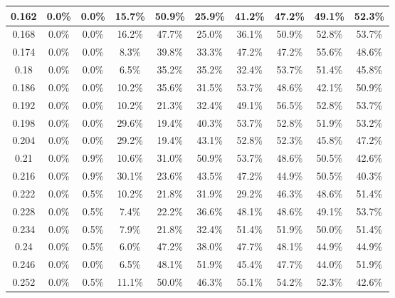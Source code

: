 \begin{table}[H]
\begin{tabular}{|c|c|c|c|c|c|c|c|c|c|}
\hline
0.162 & \cellcolor{green!25}0.0\% & \cellcolor{green!25}0.0\% & 15.7\% & 50.9\% & 25.9\% & 41.2\% & 47.2\% & 49.1\% & 52.3\% \\
\hline
0.168 & \cellcolor{green!25}0.0\% & \cellcolor{green!25}0.0\% & 16.2\% & 47.7\% & 25.0\% & 36.1\% & 50.9\% & 52.8\% & 53.7\% \\
\hline
0.174 & \cellcolor{green!25}0.0\% & \cellcolor{green!25}0.0\% & 8.3\% & 39.8\% & 33.3\% & 47.2\% & 47.2\% & 55.6\% & 48.6\% \\
\hline
0.18 & \cellcolor{green!25}0.0\% & \cellcolor{green!25}0.0\% & 6.5\% & 35.2\% & 35.2\% & 32.4\% & 53.7\% & 51.4\% & 45.8\% \\
\hline
0.186 & \cellcolor{green!25}0.0\% & \cellcolor{green!25}0.0\% & 10.2\% & 35.6\% & 31.5\% & 53.7\% & 48.6\% & 42.1\% & 50.9\% \\
\hline
0.192 & \cellcolor{green!25}0.0\% & \cellcolor{green!25}0.0\% & 10.2\% & 21.3\% & 32.4\% & 49.1\% & 56.5\% & 52.8\% & 53.7\% \\
\hline
0.198 & \cellcolor{green!25}0.0\% & \cellcolor{green!25}0.0\% & 29.6\% & 19.4\% & 40.3\% & 53.7\% & 52.8\% & 51.9\% & 53.2\% \\
\hline
0.204 & \cellcolor{green!25}0.0\% & \cellcolor{green!25}0.0\% & 29.2\% & 19.4\% & 43.1\% & 52.8\% & 52.3\% & 45.8\% & 47.2\% \\
\hline
0.21 & \cellcolor{green!25}0.0\% & 0.9\% & 10.6\% & 31.0\% & 50.9\% & 53.7\% & 48.6\% & 50.5\% & 42.6\% \\
\hline
0.216 & \cellcolor{green!25}0.0\% & 0.9\% & 30.1\% & 23.6\% & 43.5\% & 47.2\% & 44.9\% & 50.5\% & 40.3\% \\
\hline
0.222 & \cellcolor{green!25}0.0\% & 0.5\% & 10.2\% & 21.8\% & 31.9\% & 29.2\% & 46.3\% & 48.6\% & 51.4\% \\
\hline
0.228 & \cellcolor{green!25}0.0\% & 0.5\% & 7.4\% & 22.2\% & 36.6\% & 48.1\% & 48.6\% & 49.1\% & 53.7\% \\
\hline
0.234 & \cellcolor{green!25}0.0\% & 0.5\% & 7.9\% & 21.8\% & 32.4\% & 51.4\% & 51.9\% & 50.0\% & 51.4\% \\
\hline
0.24 & \cellcolor{green!25}0.0\% & 0.5\% & 6.0\% & 47.2\% & 38.0\% & 47.7\% & 48.1\% & 44.9\% & 44.9\% \\
\hline
0.246 & \cellcolor{green!25}0.0\% & \cellcolor{green!25}0.0\% & 6.5\% & 48.1\% & 51.9\% & 45.4\% & 47.7\% & 44.0\% & 51.9\% \\
\hline
0.252 & \cellcolor{green!25}0.0\% & 0.5\% & 11.1\% & 50.0\% & 46.3\% & 55.1\% & 54.2\% & 52.3\% & 42.6\% \\
\hline
\end{tabular}
\end{table}

